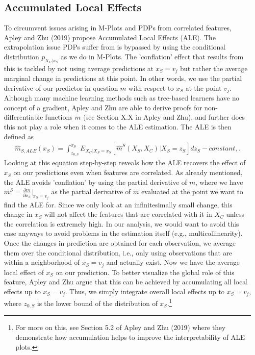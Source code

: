 \subsection{Accumulated Local Effects}
To circumvent issues arising in M-Plots and PDPs from correlated features, Apley and Zhu (2019) propose Accumulated Local Effects (ALE). The extrapolation issue PDPs suffer from is bypassed by using the conditional distribution $p_{X_C|x_S}$ as we do in M-Plots. The 'conflation' effect that results from this is tackled by not using average predictions at $x_S=v_j$ but rather the average marginal change in predictions at this point. In other words, we use the partial derivative of our predictor in question $m$ with respect to $x_S$ at the point $v_j$. Although many machine learning methods such as tree-based learners have no concept of a gradient, Apley and Zhu are able to derive proofs for non-differentiable functions $m$ (see Section X.X in Apley and Zhu), and further does this not play a role when it comes to the ALE estimation. The ALE is then defined as
\begin{align}
\hat{m}_{S, ALE} (x_S)=\int_{z_{0, S}}^{x_S} E_{X_C|X_S=x_S}[\hat{m}^S(X_S, X_C)|X_S=z_S]dz_S - constant, \label{eq:ale}.
\end{align}
Looking at this equation step-by-step reveals how the ALE recovers the effect of $x_S$ on our predictions even when features are correlated. As already mentioned, the ALE avoids 'conflation' by using the partial derivative of $m$, where we have $m^S=\frac{\partial m}{\partial x_S}\rvert_{x_S=v_j}$ as the partial derivative of $m$ evaluated at the point we want to find the ALE for. Since we only look at an infinitesimally small change, this change in $x_S$ will not affect the features that are correlated with it in $X_C$ unless the correlation is extremely high. In our analysis, we would want to avoid this case anyways to avoid problems in the estimation itself (e.g., multicollinearity). Once the changes in prediction are obtained for each observation, we average them over the conditional distribution, i.e., only using observations that are within a neighborhood of $x_S=v_j$ and actually exist. Now we have the average local effect of $x_S$ on our prediction. To better visualize the global role of this feature, Apley and Zhu argue that this can be achieved by accumulating all local effects up to $x_S=v_j$. Thus, we simply integrate overall local effects up to $x_S=v_j$, where $z_{0, S}$ is the lower bound of the distribution of $x_S$.\footnote{For more on this, see Section 5.2 of Apley and Zhu (2019) where they demonstrate how accumulation helps to improve the interpretability of ALE plots.} \\
